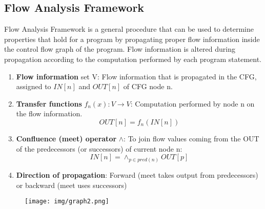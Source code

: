 \documentclass[a4paper, 10pt, titlepage]{article}
\begin{document}
\subsection{Flow Analysis Framework}
Flow Analysis Framework is a general procedure that can be used to determine properties that hold for a program by propagating proper flow information inside the control flow graph of the program. Flow information is altered during propagation according to the computation performed by each program statement. 
\begin{enumerate}
\item \textbf{Flow information} set V: Flow information that is propagated in the CFG, assigned to $IN[n]$ and $OUT[n]$ of CFG node n.
\item \textbf{Transfer functions} $f_n(x): V \rightarrow V$: Computation performed by node n on the flow information. $$OUT[n]=f_n(IN[n])$$
\item \textbf{Confluence (meet) operator} $\wedge$: To join flow values coming from the OUT of the predecessors (or successors) of current node n:
$$IN[n]=\wedge_{p \in pred(n)} OUT[p]$$
\item \textbf{Direction of propagation}: Forward (meet takes output from predecessors) or backward (meet uses successors)
\end{enumerate}
\begin{figure}[h]
\centering
\texttt{[image: img/graph2.png]}
\end{figure}
\end{document}
